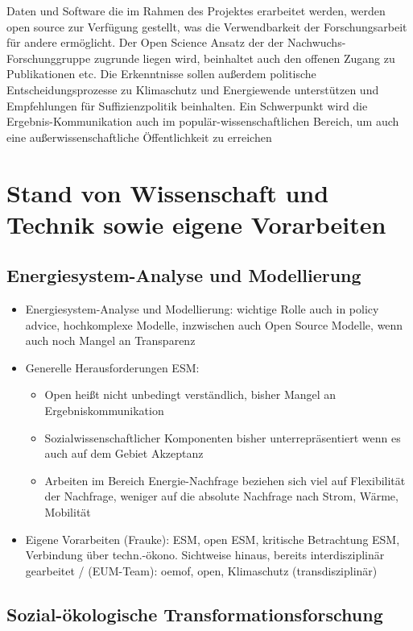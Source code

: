 \documentclass[a4paper,11pt,twoside]{scrartcl}
\begin{document}
Daten und Software die im Rahmen des Projektes erarbeitet werden, werden open source zur Verfügung gestellt, was die Verwendbarkeit der Forschungsarbeit für andere ermöglicht. Der Open Science Ansatz der der Nachwuchs-Forschunggruppe zugrunde liegen wird, beinhaltet auch den offenen Zugang zu Publikationen etc. Die Erkenntnisse sollen außerdem politische Entscheidungsprozesse zu Klimaschutz und Energiewende unterstützen und Empfehlungen für Suffizienzpolitik beinhalten. Ein Schwerpunkt wird die Ergebnis-Kommunikation auch im populär-wissenschaftlichen Bereich, um auch eine außerwissenschaftliche Öffentlichkeit zu erreichen

\section{Stand von Wissenschaft und Technik sowie eigene Vorarbeiten}
\subsection*{Energiesystem-Analyse und Modellierung}
\begin{itemize}
    \item Energiesystem-Analyse und Modellierung: wichtige Rolle auch in policy advice, hochkomplexe Modelle, inzwischen auch Open Source Modelle, wenn auch noch Mangel an Transparenz
    \item Generelle Herausforderungen ESM:
    \begin{itemize}
     \item Open heißt nicht unbedingt verständlich, bisher Mangel an Ergebniskommunikation 
     \item Sozialwissenschaftlicher Komponenten bisher unterrepräsentiert wenn es auch auf dem Gebiet Akzeptanz
     \item Arbeiten im Bereich Energie-Nachfrage beziehen sich viel auf Flexibilität der Nachfrage, weniger auf die absolute Nachfrage nach Strom, Wärme, Mobilität
    \end{itemize}
    \item Eigene Vorarbeiten (Frauke): ESM, open ESM, kritische Betrachtung ESM, Verbindung über techn.-ökono. Sichtweise hinaus, bereits interdisziplinär gearbeitet / (EUM-Team): oemof, open, Klimaschutz (transdisziplinär)
\end{itemize}

\subsection*{Sozial-ökologische Transformationsforschung}
    
\end{document}
